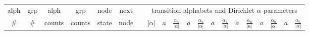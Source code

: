\documentclass[11pt]{article}
\newif\ifdraft
\renewcommand{\baselinestretch}{1.5}
\renewcommand{\baselinestretch}{1.5}
\begin{document}
\ifdraft
\renewcommand{\baselinestretch}{1.0}
\begin{table}
\renewcommand{\tabcolsep}{0.7em}
\tiny
\begin{center}
\begin{tabular}{|rr|rr|cc|c|c|cc|cc|cc|cc|cc|cc|} \cline{1-6} \cline{8-20}
\multicolumn{1}{|c}{alph} & \multicolumn{1}{c|}{grp} &
  \multicolumn{1}{c}{alph} & \multicolumn{1}{c|}{grp} & node & next &
  & \multicolumn{13}{|c|}{transition alphabets and Dirichlet $\alpha$ parameters} \\ %
\multicolumn{1}{|c}{\#} & \multicolumn{1}{c|}{\#} & \multicolumn{1}{c}{counts} & \multicolumn{1}{c|}{counts} & state & node & & $|\alpha|$ & $a$ &
  $\frac{\alpha_{a}}{|\alpha|}$ & $a$ & $\frac{\alpha_{a}}{|\alpha|}$ & $a$ &
  $\frac{\alpha_{a}}{|\alpha|}$ & $a$ & $\frac{\alpha_{a}}{|\alpha|}$ & $a$ &
  $\frac{\alpha_{a}}{|\alpha|}$ & $a$ & $\frac{\alpha_{a}}{|\alpha|}$ \\
  \cline{1-6} \cline {8-20} 


\end{tabular}
\end{center}
\end{table}
\end{document}
